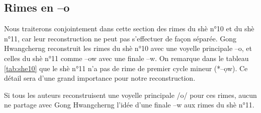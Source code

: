 \documentclass[oldfontcommands,twoside,a4paper,11pt,draft]{memoir}
\newcommand{\ipa}[1]{{\phon #1}} %
\newcommand{\ipapl}[1]{{\phondroit #1}}
\begin{document}
\subsection{Rimes en \ipapl{--o} } \label{subsec:voyelle.o}
Nous traiterons conjointement dans cette section des rimes du  \ipa{shè} n°10 et du \ipa{shè} n°11, car leur reconstruction ne peut pas s'effectuer de façon séparée. Gong Hwangcherng reconstruit les rimes du  \ipa{shè} n°10  avec une voyelle principale --o, et celles du \ipa{shè} n°11 comme --ow avec une finale --w. On remarque dans le tableau \ref{tab:she10} que le \ipa{shè} n°11 n'a pas de rime de premier cycle mineur (*--\ipapl{ọw}). Ce détail sera d'une grand importance pour notre reconstruction.

Si tous les auteurs reconstruisent une voyelle principale /o/ pour ces rimes, aucun ne partage avec Gong Hwangcherng l'idée d'une finale --w aux rimes du \ipa{shè} n°11. 
\end{document}
